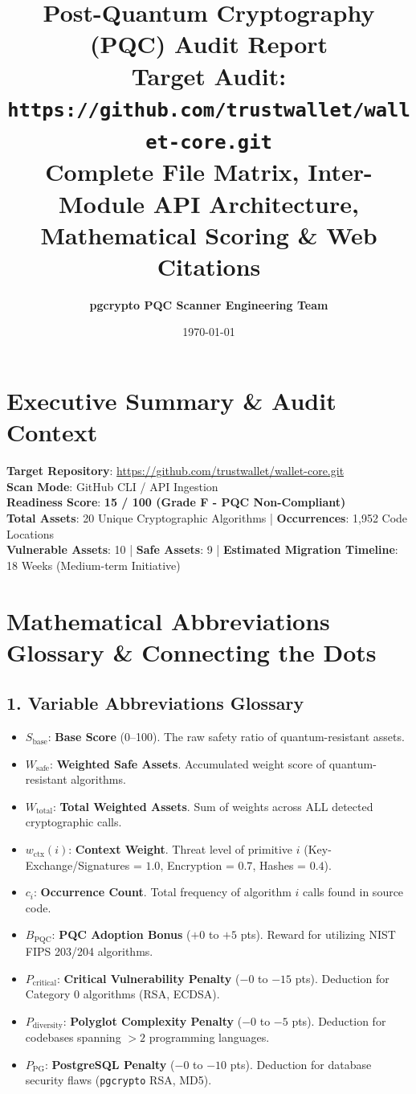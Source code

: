 \documentclass[11pt,a4paper,landscape]{article}
\title{\textbf{\Huge Post-Quantum Cryptography (PQC) Audit Report}\\[0.3em] \large Target Audit: \texttt{https://github.com/trustwallet/wallet-core.git} \\ \small Complete File Matrix, Inter-Module API Architecture, Mathematical Scoring \& Web Citations}
\author{\textbf{pgcrypto PQC Scanner Engineering Team}}
\date{\today}
\begin{document}
\maketitle

\section{Executive Summary \& Audit Context}
\textbf{Target Repository}: \url{https://github.com/trustwallet/wallet-core.git} \\
\textbf{Scan Mode}: GitHub CLI / API Ingestion \\
\textbf{Readiness Score}: \textbf{15 / 100 (Grade F - PQC Non-Compliant)} \\
\textbf{Total Assets}: 20 Unique Cryptographic Algorithms | \textbf{Occurrences}: 1,952 Code Locations \\
\textbf{Vulnerable Assets}: 10 | \textbf{Safe Assets}: 9 | \textbf{Estimated Migration Timeline}: 18 Weeks (Medium-term Initiative)

\vspace{1em}

\section{Mathematical Abbreviations Glossary \& Connecting the Dots}

\subsection{1. Variable Abbreviations Glossary}
\begin{itemize}
    \item $S_{\text{base}}$: \textbf{Base Score} (0--100). The raw safety ratio of quantum-resistant assets.
    \item $W_{\text{safe}}$: \textbf{Weighted Safe Assets}. Accumulated weight score of quantum-resistant algorithms.
    \item $W_{\text{total}}$: \textbf{Total Weighted Assets}. Sum of weights across ALL detected cryptographic calls.
    \item $w_{\text{ctx}}(i)$: \textbf{Context Weight}. Threat level of primitive $i$ (Key-Exchange/Signatures = $1.0$, Encryption = $0.7$, Hashes = $0.4$).
    \item $c_i$: \textbf{Occurrence Count}. Total frequency of algorithm $i$ calls found in source code.
    \item $B_{\text{PQC}}$: \textbf{PQC Adoption Bonus} ($+0$ to $+5$ pts). Reward for utilizing NIST FIPS 203/204 algorithms.
    \item $P_{\text{critical}}$: \textbf{Critical Vulnerability Penalty} ($-0$ to $-15$ pts). Deduction for Category 0 algorithms (RSA, ECDSA).
    \item $P_{\text{diversity}}$: \textbf{Polyglot Complexity Penalty} ($-0$ to $-5$ pts). Deduction for codebases spanning $> 2$ programming languages.
    \item $P_{\text{PG}}$: \textbf{PostgreSQL Penalty} ($-0$ to $-10$ pts). Deduction for database security flaws (\texttt{pgcrypto} RSA, MD5).
\end{itemize}
\end{document}
